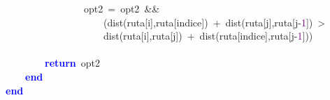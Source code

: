 \mbox{}\ \ \ \ \ \ \ \ \ \ \ \ \ \ \ \ opt2\ \textcolor{BrickRed}{=}\ opt2\ \textcolor{BrickRed}{\&\&} \\
\mbox{}\ \ \ \ \ \ \ \ \ \ \ \ \ \ \ \ \ \ \ \ \textcolor{BrickRed}{(}dist\textcolor{BrickRed}{(}ruta\textcolor{BrickRed}{[}i\textcolor{BrickRed}{],}ruta\textcolor{BrickRed}{[}indice\textcolor{BrickRed}{])}\ \textcolor{BrickRed}{+}\ dist\textcolor{BrickRed}{(}ruta\textcolor{BrickRed}{[}j\textcolor{BrickRed}{],}ruta\textcolor{BrickRed}{[}j\textcolor{BrickRed}{-}\textcolor{Purple}{1}\textcolor{BrickRed}{])}\ \textcolor{BrickRed}{\textgreater{}} \\
\mbox{}\ \ \ \ \ \ \ \ \ \ \ \ \ \ \ \ \ \ \ \ dist\textcolor{BrickRed}{(}ruta\textcolor{BrickRed}{[}i\textcolor{BrickRed}{],}ruta\textcolor{BrickRed}{[}j\textcolor{BrickRed}{])}\ \textcolor{BrickRed}{+}\ dist\textcolor{BrickRed}{(}ruta\textcolor{BrickRed}{[}indice\textcolor{BrickRed}{],}ruta\textcolor{BrickRed}{[}j\textcolor{BrickRed}{-}\textcolor{Purple}{1}\textcolor{BrickRed}{]))} \\
\mbox{} \\
\mbox{}\ \ \ \ \ \ \ \ \textbf{\textcolor{Blue}{return}}\ opt2 \\
\mbox{}\ \ \ \ \textbf{\textcolor{Blue}{end}} \\
\mbox{}\textbf{\textcolor{Blue}{end}} \\
\mbox{}
